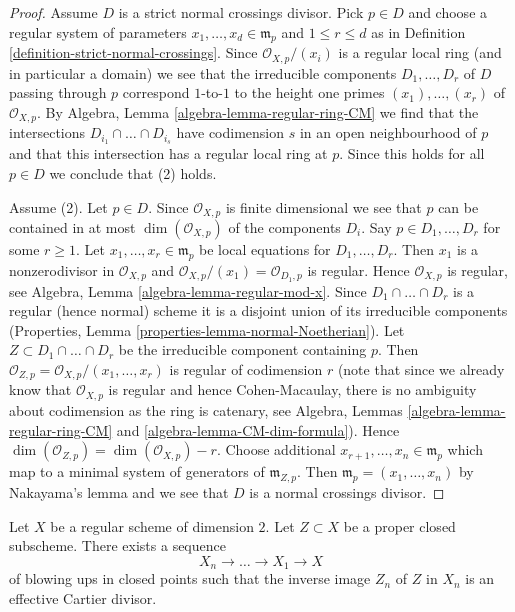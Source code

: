 \begin{proof}
Assume $D$ is a strict normal crossings divisor. Pick $p \in D$
and choose a regular system of parameters $x_1, \ldots, x_d \in \mathfrak m_p$
and $1 \leq r \leq d$ as in
Definition \ref{definition-strict-normal-crossings}.
Since $\mathcal{O}_{X, p}/(x_i)$ is a regular local ring
(and in particular a domain) we see that the irreducible components
$D_1, \ldots, D_r$ of $D$ passing through $p$ correspond $1$-to-$1$
to the height one primes $(x_1), \ldots, (x_r)$ of $\mathcal{O}_{X, p}$.
By Algebra, Lemma \ref{algebra-lemma-regular-ring-CM}
we find that the intersections $D_{i_1} \cap \ldots \cap D_{i_s}$
have codimension $s$ in an open neighbourhood of $p$
and that this intersection has a regular local ring at $p$.
Since this holds for all $p \in D$ we conclude that (2) holds.

\medskip\noindent
Assume (2). Let $p \in D$. Since $\mathcal{O}_{X, p}$ is finite
dimensional we see that $p$ can be contained in at most
$\dim(\mathcal{O}_{X, p})$ of the components $D_i$.
Say $p \in D_1, \ldots, D_r$ for some $r \geq 1$.
Let $x_1, \ldots, x_r \in \mathfrak m_p$ be local equations
for $D_1, \ldots, D_r$. Then $x_1$ is a nonzerodivisor in $\mathcal{O}_{X, p}$
and $\mathcal{O}_{X, p}/(x_1) = \mathcal{O}_{D_1, p}$ is regular.
Hence $\mathcal{O}_{X, p}$ is regular, see
Algebra, Lemma \ref{algebra-lemma-regular-mod-x}.
Since $D_1 \cap \ldots \cap D_r$ is a regular (hence normal) scheme
it is a disjoint union of its irreducible components
(Properties, Lemma \ref{properties-lemma-normal-Noetherian}).
Let $Z \subset D_1 \cap \ldots \cap D_r$
be the irreducible component containing $p$.
Then $\mathcal{O}_{Z, p} = \mathcal{O}_{X, p}/(x_1, \ldots, x_r)$
is regular of codimension $r$ (note that since we already know
that $\mathcal{O}_{X, p}$ is regular and hence Cohen-Macaulay,
there is no ambiguity about codimension as the ring is catenary, see
Algebra, Lemmas \ref{algebra-lemma-regular-ring-CM} and
\ref{algebra-lemma-CM-dim-formula}).
Hence $\dim(\mathcal{O}_{Z, p}) = \dim(\mathcal{O}_{X, p}) - r$.
Choose additional $x_{r + 1}, \ldots, x_n \in \mathfrak m_p$
which map to a minimal system of generators of $\mathfrak m_{Z, p}$.
Then $\mathfrak m_p = (x_1, \ldots, x_n)$ by Nakayama's lemma
and we see that $D$ is a normal crossings divisor.
\end{proof}

\begin{lemma}
\label{lemma-turn-into-effective-Cartier}
Let $X$ be a regular scheme of dimension $2$. Let $Z \subset X$
be a proper closed subscheme. There exists a sequence
$$
X_n \to \ldots \to X_1 \to X
$$
of blowing ups in closed points such that the inverse image $Z_n$ of $Z$
in $X_n$ is an effective Cartier divisor.
\end{lemma}


